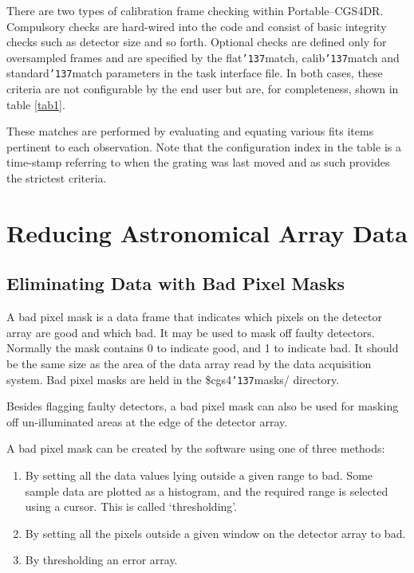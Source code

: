 \documentclass[a4paper]{book}
\newcommand{\stardocinitials}  {SUN}
\newcommand{\stardocnumber}    {27.5}
\newcommand{\stardocname}{\stardocinitials /\stardocnumber}
\renewcommand{\_}{{\tt\char'137}}
\begin{document}
There are two types of calibration frame checking within Portable--CGS4DR. 
Compulsory checks are hard-wired into the code and consist of basic
integrity checks such as detector size and so forth. Optional checks are
defined only for oversampled frames and are specified by the flat\_match,
calib\_match and standard\_match parameters in the task interface file. In
both cases, these criteria are not configurable by the end user but are,
for completeness, shown in table \ref{tab1}. 

These matches are performed by evaluating and equating various {\sc fits}
items pertinent to each observation. Note that the configuration index in
the table is a time-stamp referring to when the grating was last moved and
as such provides the strictest criteria. 

\chapter{Reducing Astronomical Array Data}
\markboth{General DR Paradigms}{\stardocname}
\section{Eliminating Data with Bad Pixel Masks}
A bad pixel mask is a data frame that indicates which pixels on the
detector array are good and which bad. It may be used to mask off faulty
detectors. Normally the mask contains 0 to indicate good, and 1 to
indicate bad. It should be the same size as the area of the data array
read by the data acquisition system. Bad pixel masks are held in the {\sc
\$cgs4\_masks/} directory. 

Besides flagging faulty detectors, a bad pixel mask can also be used for
masking off un-illuminated areas at the edge of the detector array. 

A bad pixel mask can be created by the software using one of three
methods: 

\begin{enumerate}
 \item By setting all the data values lying outside a given range to bad.
 Some sample data are plotted as a histogram, and the required range is 
 selected using a cursor. This is called `thresholding'.
 \item By setting all the pixels outside a given window on the detector 
 array to bad.
 \item By thresholding an error array.
\end{enumerate}
\end{document}
